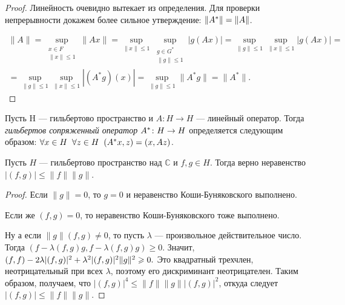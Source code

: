 \documentclass[12pt,titlepage, a4paper]{article}
\begin{document}
\begin{proof}
Линейность очевидно вытекает из определения. Для проверки
непрерывности докажем более сильное утверждение: $\|A^*\|\p=\|A\|$.

\begin{multline*}
\|A\|=\sup\limits_{\substack{x\in F\\ \|x\|\leqslant
1}}\|Ax\|=\sup\limits_{\|x\|\leqslant 1}\sup\limits_{\substack{g\in
G^*\\ \|g\|\leqslant 1}}|g(Ax)|=\sup\limits_{\|g\|\leqslant
1}\sup\limits_{\|x\|\leqslant 1}|g(Ax)|=\\
=\sup\limits_{\|g\|\leqslant 1}\sup\limits_{\|x\|\leqslant
1}|(A^*g)(x)|=\sup\limits_{\|g\|\leqslant 1}\|A^*g\|=\|A^*\|.
\end{multline*}
\end{proof}

\begin{defen}
Пусть H --- гильбертово пространство и $A\colon H\rightarrow H$
--- линейный оператор. Тогда \emph{гильбертов сопряженный оператор}
$A^*\colon H\p\rightarrow H$ определяется следующим образом:
$\forall x\in H \;\;\forall z\in H \;\;(A^*x,z)\p=(x,Az)$.
\end{defen}

\clearpage

\lecture

\begin{theorem}\label{th.kompl.Koshi} Пусть $H$ --- гильбертово пространство
над $\mathbb{C}$ и $f,g\in H$. Тогда верно неравенство
$|(f,g)|\leqslant \|f\|\|g\|$.
\end{theorem}

\begin{proof}
Если $\|g\|=0$, то $g=0$ и неравенство Коши-Буняковс\-кого
выполнено.

Если же $(f,g)=0$, то неравенство Коши-Буняковского тоже выполнено.

Ну а если $\|g\|(f,g)\neq0$, то пусть $\lambda$ --- произвольное
действительное число. Тогда
$(f-\lambda(f,g)g,f-\lambda(f,g)g)\geqslant 0.$ Значит,
$(f,f)-2\lambda|(f,g)|^2\p+\lambda^2|(f,g)|^2\|g\|^2\geqslant0.$ Это
квадратный трехчлен, неотрицательный при всех $\lambda$, поэтому его
дискриминант неотрицателен. Таким образом, получаем, что
$|(f,g)|^4\leqslant \|f\|\|g\||(f,g)|^2$, откуда следует
$|(f,g)|\leqslant \|f\|\|g\|.$
\end{proof}
\end{document}
